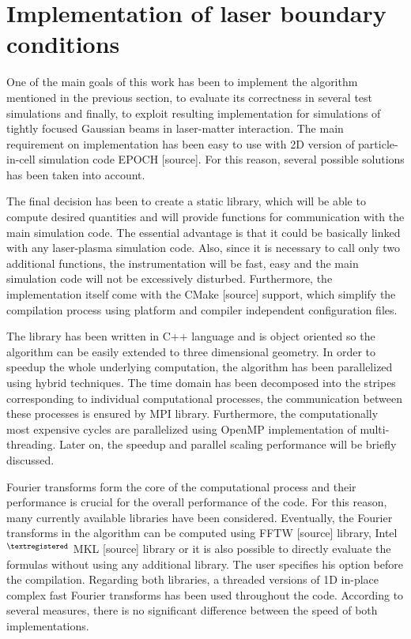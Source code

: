 \section{Implementation of laser boundary conditions}

One of the main goals of this work has been to implement the algorithm mentioned in the previous section, to evaluate its correctness in several test simulations and finally, to exploit resulting implementation for simulations of tightly focused Gaussian beams in laser-matter interaction. The main requirement on implementation has been easy to use with 2D version of particle-in-cell simulation code EPOCH [source]. For this reason, several possible solutions has been taken into account.

The final decision has been to create a static library, which will be able to compute desired quantities and will provide functions for communication with the main simulation code. The essential advantage is that it could be basically linked with any laser-plasma simulation code. Also, since it is necessary to call only two additional functions, the instrumentation will be fast, easy and the main simulation code will not be excessively disturbed. Furthermore, the implementation itself come with the CMake [source] support, which simplify the compilation process using platform and compiler independent configuration files.

The library has been written in C++ language and is object oriented so the algorithm can be easily extended to three dimensional geometry. In order to speedup the whole underlying computation, the algorithm has been parallelized using hybrid techniques. The time domain has been decomposed into the stripes corresponding to individual computational processes, the communication between these processes is ensured by MPI library. Furthermore, the computationally most expensive cycles are parallelized using OpenMP implementation of multi-threading. Later on, the speedup and parallel scaling performance will be briefly discussed.

Fourier transforms form the core of the computational process and their performance is crucial for the overall performance of the code. For this reason, many currently available libraries have been considered. Eventually, the Fourier transforms in the algorithm can be computed using FFTW [source] library, Intel$ ^{\scriptsize \textregistered} $ MKL [source] library or it is also possible to directly evaluate the formulas without using any additional library. The user specifies his option before the compilation. Regarding both libraries, a threaded versions of 1D in-place complex fast Fourier transforms has been used throughout the code. According to several measures, there is no significant difference between the speed of both implementations.

